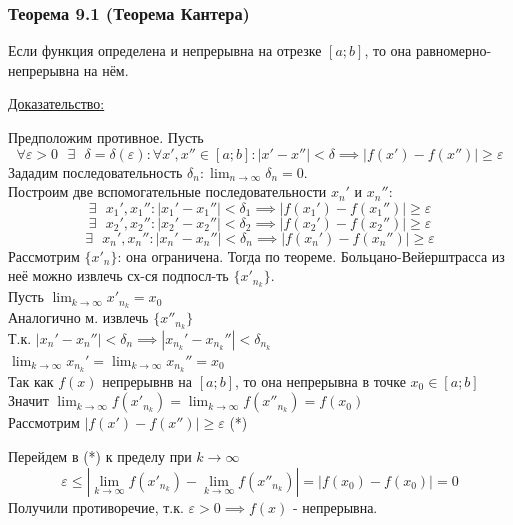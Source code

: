 \documentclass[12pt]{article}
\def\posl#1#2{\{#1_{#2}\}}
\begin{document}
    \subsubsection*{Теорема 9.1 (Теорема Кантера)}
    Если функция определена и непрерывна на отрезке $[a; b]$, то она равномерно-непрерывна на нём.\par\noindent
    \underline{Доказательство:}
    \begin{adjustwidth}{1.5em}{1.5em}
        Предположим противное. Пусть \[\forall \varepsilon > 0 \text{ } \exists \text{ } \delta = \delta(\varepsilon) : \forall x', x'' \in [a;b] :  |x' - x''| < \delta \implies |f(x') - f(x'')| \ge \varepsilon \]
        Зададим последовательность $\delta_n : \lim_{n\to\infty} \delta_n = 0$.\\
        Построим две вспомогательные последовательности $x_n'$ и $x_n''$:
        \[ \exists \text{ } x_1', x_1'' : |x_1' - x_1''| < \delta_1 \implies |f(x_1') - f(x_1'')| \ge \varepsilon \]
        \[ \exists \text{ } x_2', x_2'' : |x_2' - x_2''| < \delta_2 \implies |f(x_2') - f(x_2'')| \ge \varepsilon \]
        \[ \exists \text{ } x_n', x_n'' : |x_n' - x_n''| < \delta_n \implies |f(x_n') - f(x_n'')| \ge \varepsilon \]
        Рассмотрим $\posl{x'}{n}$: она ограничена. Тогда по теореме. Больцано-Вейерштрасса из неё можно извлечь сх-ся подпосл-ть $\posl{x'}{n_k}$.\\
        Пусть $\lim_{k\to\infty} x'_{n_k} = x_0$\\
        Аналогично м. извлечь $\posl{x''}{n_k}$\\
        Т.к. $|x_n' - x_n''| < \delta_n \implies |x_{n_k}' - x_{n_k}''| < \delta_{n_k}$\\
        $\lim_{k\to\infty}x_{n_k}' = \lim_{k\to\infty}x_{n_k}'' = x_0$\\
        Так как $f(x)$ непрерывнв на $[a; b]$, то она непрерывна в точке $x_0 \in [a;b]$\\
        Значит $\lim_{k\to\infty}f(x'_{n_k}) = \lim_{k\to\infty}f(x''_{n_k}) = f(x_0)$\\
        Рассмотрим $|f(x') - f(x'')| \ge \varepsilon$ (*)
        \begin{adjustwidth}{1.5em}{1.5em}
            Перейдем в (*) к пределу при $k \to \infty$
            \[ \varepsilon \le | \lim_{k\to\infty}f(x'_{n_k}) - \lim_{k\to\infty}f(x''_{n_k})| = |f(x_0) - f(x_0)| = 0 \]
            Получили противоречие, т.к. $\varepsilon > 0 \implies f(x)$ - непрерывна.
        \end{adjustwidth}
    \end{adjustwidth}
\end{document}
